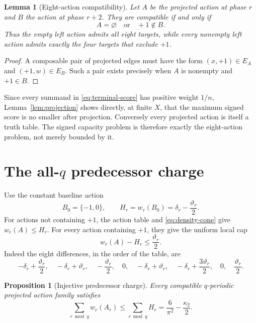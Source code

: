 \documentclass[11pt]{article}
\newtheorem{proposition}[theorem]{Proposition}
\newtheorem{lemma}[theorem]{Lemma}
\theoremstyle{definition}
\theoremstyle{remark}
\newcommand{\dd}{\delta}
\newcommand{\thh}{\vartheta}
\newcommand{\kap}{\kappa_2}
\begin{document}
\begin{lemma}[Eight-action compatibility]
\label{lem:action-compatibility}
Let $A$ be the projected action at phase $r$ and $B$ the action at phase
$r+2$.  They are compatible if and only if
\begin{equation}
 A=\varnothing\quad\text{or}\quad +1\notin B.
 \label{eq:action-compatibility}
\end{equation}
Thus the empty left action admits all eight targets, while every nonempty
left action admits exactly the four targets that exclude $+1$.
\end{lemma}

\begin{proof}
A composable pair of projected edges must have the form
$(x,+1)\in E_A$ and $(+1,w)\in E_B$.  Such a pair exists precisely when
$A$ is nonempty and $+1\in B$.
\end{proof}

Since every summand in \eqref{eq:terminal-score} has positive weight
$1/n$, Lemma~\ref{lem:projection} shows directly, at finite $X$, that the
maximum signed score is no smaller after projection.  Conversely every
projected action is itself a truth table.  The signed capacity problem is
therefore exactly the eight-action problem, not merely bounded by it.

\section{The all-\texorpdfstring{$q$}{q} predecessor charge}

Use the constant baseline action
\begin{equation}
 B_0=\{-1,0\},
 \qquad
 H_r=w_r(B_0)=\dd_r-\frac{\thh_r}{2}.
 \label{eq:baseline}
\end{equation}
For actions not containing $+1$, the action table and
\eqref{eq:density-cone} give $w_r(A)\le H_r$.  For every action containing
$+1$, they give the uniform local cap
\begin{equation}
 w_r(A)-H_r\le\frac{\thh_r}{2}.
 \label{eq:plus-gain}
\end{equation}
Indeed the eight differences, in the order of the table, are
\[
 -\dd_r+\frac{\thh_r}{2},\quad
 -\dd_r+\thh_r,\quad
 -\frac{\thh_r}{2},\quad0,\quad
 -\dd_r+\thh_r,\quad
 -\dd_r+\frac{3\thh_r}{2},\quad0,\quad
 \frac{\thh_r}{2}.
\]

\begin{proposition}[Injective predecessor charge]
\label{prop:charge}
Every compatible $q$-periodic projected action family satisfies
\begin{equation}
 \sum_{r\bmod q}w_r(A_r)
 \le\sum_{r\bmod q}H_r
 =\frac6{\pi^2}-\frac{\kap}{2}.
 \label{eq:charge-upper}
\end{equation}
\end{proposition}
\end{document}
